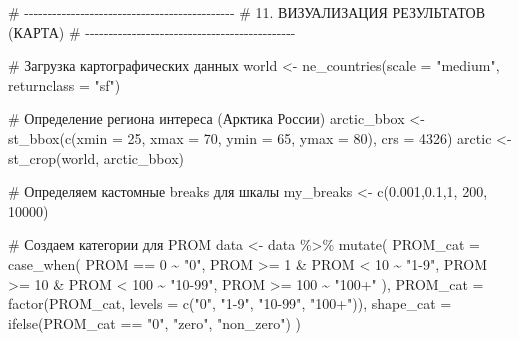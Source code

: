 \documentclass[
  letterpaper,
  DIV=11,
  numbers=noendperiod]{scrreprt}
\newenvironment{Shaded}{\begin{snugshade}}{\end{snugshade}}
\newcommand{\AttributeTok}[1]{\textcolor[rgb]{0.40,0.45,0.13}{#1}}
\newcommand{\CommentTok}[1]{\textcolor[rgb]{0.37,0.37,0.37}{#1}}
\newcommand{\DecValTok}[1]{\textcolor[rgb]{0.68,0.00,0.00}{#1}}
\newcommand{\FloatTok}[1]{\textcolor[rgb]{0.68,0.00,0.00}{#1}}
\newcommand{\FunctionTok}[1]{\textcolor[rgb]{0.28,0.35,0.67}{#1}}
\newcommand{\NormalTok}[1]{\textcolor[rgb]{0.00,0.23,0.31}{#1}}
\newcommand{\OtherTok}[1]{\textcolor[rgb]{0.00,0.23,0.31}{#1}}
\newcommand{\SpecialCharTok}[1]{\textcolor[rgb]{0.37,0.37,0.37}{#1}}
\newcommand{\StringTok}[1]{\textcolor[rgb]{0.13,0.47,0.30}{#1}}
\begin{document}
\begin{Shaded}
\begin{Highlighting}[]
\CommentTok{\# {-}{-}{-}{-}{-}{-}{-}{-}{-}{-}{-}{-}{-}{-}{-}{-}{-}{-}{-}{-}{-}{-}{-}{-}{-}{-}{-}{-}{-}{-}{-}{-}{-}{-}{-}{-}{-}{-}{-}{-}{-}{-}{-}{-}{-}}
\CommentTok{\# 11. ВИЗУАЛИЗАЦИЯ РЕЗУЛЬТАТОВ (КАРТА)}
\CommentTok{\# {-}{-}{-}{-}{-}{-}{-}{-}{-}{-}{-}{-}{-}{-}{-}{-}{-}{-}{-}{-}{-}{-}{-}{-}{-}{-}{-}{-}{-}{-}{-}{-}{-}{-}{-}{-}{-}{-}{-}{-}{-}{-}{-}{-}{-}}

\CommentTok{\# Загрузка картографических данных}
\NormalTok{world }\OtherTok{\textless{}{-}} \FunctionTok{ne\_countries}\NormalTok{(}\AttributeTok{scale =} \StringTok{"medium"}\NormalTok{, }\AttributeTok{returnclass =} \StringTok{"sf"}\NormalTok{)}

\CommentTok{\# Определение региона интереса (Арктика России)}
\NormalTok{arctic\_bbox }\OtherTok{\textless{}{-}} \FunctionTok{st\_bbox}\NormalTok{(}\FunctionTok{c}\NormalTok{(}\AttributeTok{xmin =} \DecValTok{25}\NormalTok{, }\AttributeTok{xmax =} \DecValTok{70}\NormalTok{, }\AttributeTok{ymin =} \DecValTok{65}\NormalTok{, }\AttributeTok{ymax =} \DecValTok{80}\NormalTok{), }\AttributeTok{crs =} \DecValTok{4326}\NormalTok{)}
\NormalTok{arctic }\OtherTok{\textless{}{-}} \FunctionTok{st\_crop}\NormalTok{(world, arctic\_bbox)}

\CommentTok{\# Определяем кастомные breaks для шкалы}
\NormalTok{my\_breaks }\OtherTok{\textless{}{-}} \FunctionTok{c}\NormalTok{(}\FloatTok{0.001}\NormalTok{,}\FloatTok{0.1}\NormalTok{,}\DecValTok{1}\NormalTok{,  }\DecValTok{200}\NormalTok{, }\DecValTok{10000}\NormalTok{)}

\CommentTok{\# Создаем категории для PROM}
\NormalTok{data }\OtherTok{\textless{}{-}}\NormalTok{ data }\SpecialCharTok{\%\textgreater{}\%}
  \FunctionTok{mutate}\NormalTok{(}
    \AttributeTok{PROM\_cat =} \FunctionTok{case\_when}\NormalTok{(}
\NormalTok{      PROM }\SpecialCharTok{==} \DecValTok{0} \SpecialCharTok{\textasciitilde{}} \StringTok{"0"}\NormalTok{,}
\NormalTok{      PROM }\SpecialCharTok{\textgreater{}=} \DecValTok{1} \SpecialCharTok{\&}\NormalTok{ PROM }\SpecialCharTok{\textless{}} \DecValTok{10} \SpecialCharTok{\textasciitilde{}} \StringTok{"1{-}9"}\NormalTok{,}
\NormalTok{      PROM }\SpecialCharTok{\textgreater{}=} \DecValTok{10} \SpecialCharTok{\&}\NormalTok{ PROM }\SpecialCharTok{\textless{}} \DecValTok{100} \SpecialCharTok{\textasciitilde{}} \StringTok{"10{-}99"}\NormalTok{,}
\NormalTok{      PROM }\SpecialCharTok{\textgreater{}=} \DecValTok{100} \SpecialCharTok{\textasciitilde{}} \StringTok{"100+"}
\NormalTok{    ),}
    \AttributeTok{PROM\_cat =} \FunctionTok{factor}\NormalTok{(PROM\_cat, }\AttributeTok{levels =} \FunctionTok{c}\NormalTok{(}\StringTok{"0"}\NormalTok{, }\StringTok{"1{-}9"}\NormalTok{, }\StringTok{"10{-}99"}\NormalTok{, }\StringTok{"100+"}\NormalTok{)),}
    \AttributeTok{shape\_cat =} \FunctionTok{ifelse}\NormalTok{(PROM\_cat }\SpecialCharTok{==} \StringTok{"0"}\NormalTok{, }\StringTok{"zero"}\NormalTok{, }\StringTok{"non\_zero"}\NormalTok{)}
\NormalTok{  )}


\end{Highlighting}
\end{Shaded}
\end{document}
